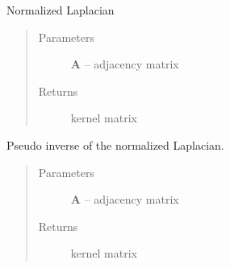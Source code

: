 \documentclass[letterpaper,10pt,english]{sphinxmanual}
\begin{document}

\begin{fulllineitems}
\label{pyGPs.GraphExtensions:pyGPs.GraphExtensions.nodeKernels.normLap}
Normalized Laplacian
\begin{quote}\begin{description}
\item[{Parameters}] \leavevmode
\textbf{A} -- adjacency matrix

\item[{Returns}] \leavevmode
kernel matrix

\end{description}\end{quote}

\end{fulllineitems}


\begin{fulllineitems}
\label{pyGPs.GraphExtensions:pyGPs.GraphExtensions.nodeKernels.psInvLapKernel}
Pseudo inverse of the normalized Laplacian.
\begin{quote}\begin{description}
\item[{Parameters}] \leavevmode
\textbf{A} -- adjacency matrix

\item[{Returns}] \leavevmode
kernel matrix

\end{description}\end{quote}

\end{fulllineitems}

\end{document}
